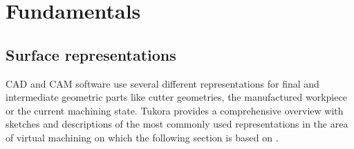\chapter{Fundamentals} %
\label{ch:fundamentals}


\section{Surface representations}
\label{sec:surface_representations}

CAD and CAM software use several different representations for final and intermediate geometric parts like cutter geometries, the manufactured workpiece or the current machining state.
Tukora provides a comprehensive overview with sketches and descriptions of the most commonly used representations in the area of virtual machining on which the following section is based on \cite{virtual_machining_review}. 

